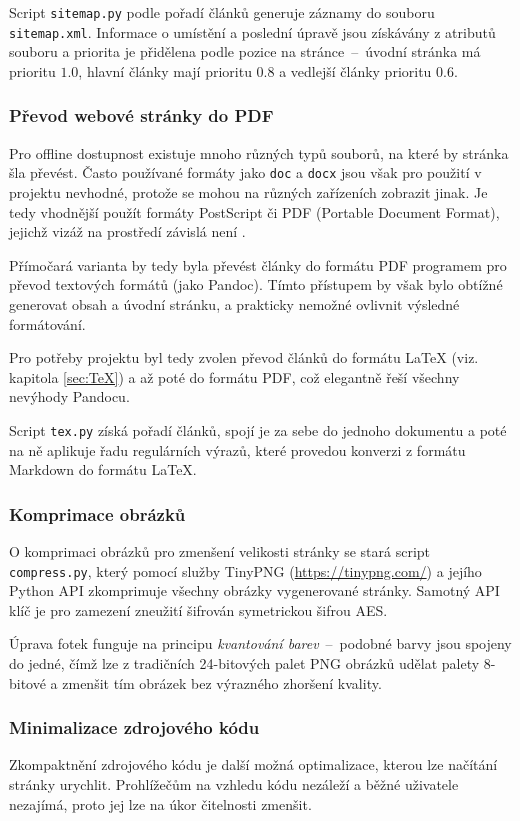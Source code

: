 \documentclass[a4paper, 12pt]{article}
\begin{document}
  Script \texttt{sitemap.py} podle pořadí článků generuje záznamy do souboru \texttt{sitemap.xml}. Informace o umístění a poslední úpravě jsou získávány z atributů souboru a priorita je přidělena podle pozice na stránce~--~úvodní stránka má prioritu $1.0$, hlavní články mají prioritu $0.8$ a vedlejší články prioritu $0.6$.


  \subsubsection{Převod webové stránky do PDF} \label{sec:Převod webové stránky do PDF}
  Pro offline dostupnost existuje mnoho různých typů souborů, na které by stránka šla převést. Často používané formáty jako \texttt{doc} a \texttt{docx} jsou však pro použití v projektu nevhodné, protože se mohou na různých zařízeních zobrazit jinak. Je tedy vhodnější použít formáty PostScript či PDF (Portable Document Format), jejichž vizáž na prostředí závislá není \cite{history-of-pdf}.

  Přímočará varianta by tedy byla převést články do formátu PDF programem pro převod textových formátů (jako Pandoc). Tímto přístupem by však bylo obtížné generovat obsah a úvodní stránku, a prakticky nemožné ovlivnit výsledné formátování.

  Pro potřeby projektu byl tedy zvolen převod článků do formátu \LaTeX{} (viz. kapitola \ref{sec:TeX}) a až poté do formátu PDF, což elegantně řeší všechny nevýhody Pandocu.

  Script \texttt{tex.py} získá pořadí článků, spojí je za sebe do jednoho dokumentu a poté na ně aplikuje řadu regulárních výrazů, které provedou konverzi z formátu Markdown do formátu \LaTeX.


  \subsubsection{Komprimace obrázků}
  O komprimaci obrázků pro zmenšení velikosti stránky se stará script \texttt{compress.py}, který pomocí služby TinyPNG (\url{https://tinypng.com/}) a jejího Python API zkomprimuje všechny obrázky vygenerované stránky. Samotný API klíč je pro zamezení zneužití šifrován symetrickou šifrou AES.

  Úprava fotek funguje na principu \emph{kvantování barev}~--~podobné barvy jsou spojeny do jedné, čímž lze z tradičních 24-bitových palet PNG obrázků udělat palety 8-bitové a zmenšit tím obrázek bez výrazného zhoršení kvality.


  \subsubsection{Minimalizace zdrojového kódu}
  Zkompaktnění zdrojového kódu je další možná optimalizace, kterou lze načítání stránky urychlit. Prohlížečům na vzhledu kódu nezáleží a běžné uživatele nezajímá, proto jej lze na úkor čitelnosti zmenšit.
\end{document}
